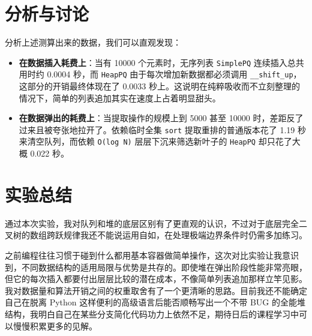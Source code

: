 \documentclass[12pt,a4paper]{ctexart}
\begin{document}
	
	
	\section{分析与讨论}
	分析上述测算出来的数据，我们可以直观发现：
	\begin{itemize}
		\item \textbf{在数据插入耗费上}：当有 10000 个元素时，无序列表 \texttt{SimplePQ} 连续插入总共用时约 0.0004 秒，而 \texttt{HeapPQ} 由于每次增加新数据都必须调用 \texttt{\_\_shift\_up}，这部分的开销最终体现在了 0.0033 秒上。这说明在纯粹吸收而不立刻整理的情况下，简单的列表追加其实在速度上占着明显甜头。
		\item \textbf{在数据弹出的耗费上}：当提取操作的规模上到 5000 甚至 10000 时，差距反了过来且被夸张地拉开了。依赖临时全集 \texttt{sort} 提取重排的普通版本花了 1.19 秒来清空队列，而依赖 \texttt{O(log N)} 层层下沉来筛选新叶子的 \texttt{HeapPQ} 却只花了大概 0.022 秒。
	\end{itemize}

	\section{实验总结}
	通过本次实验，我对队列和堆的底层区别有了更直观的认识，不过对于底层完全二叉树的数组跨跃规律我还不能说运用自如，在处理极端边界条件时仍需多加练习。
	
	之前编程往往习惯于碰到什么都用基本容器做简单操作，这次对比实验让我意识到，不同数据结构的适用局限与优势是共存的。即使堆在弹出阶段性能非常亮眼，但它的每次插入都要付出层层比较的潜在成本，不像简单列表追加那样立竿见影。我对数据量和算法开销之间的权重取舍有了一个更清晰的思路。目前我还不能确定自己在脱离 Python 这样便利的高级语言后能否顺畅写出一个不带 BUG 的全能堆结构，我明白自己在某些分支简化代码功力上依然不足，期待日后的课程学习中可以慢慢积累更多的见解。
	
\end{document}
